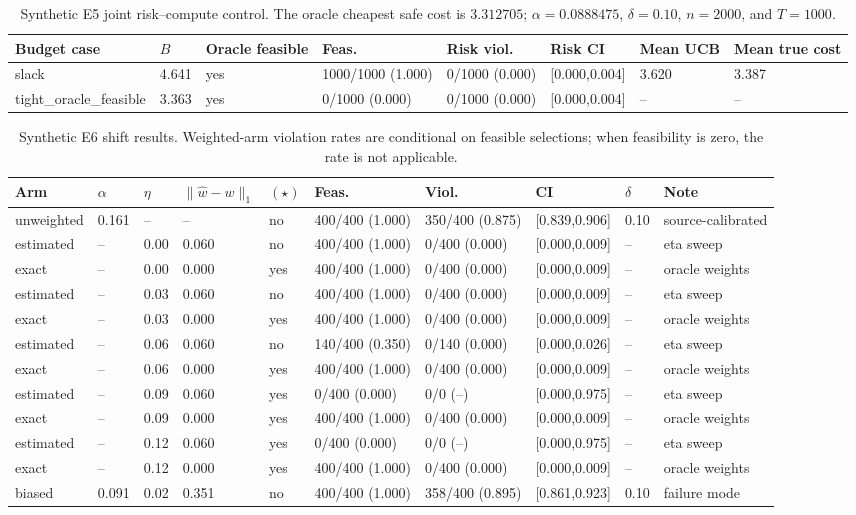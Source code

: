 \documentclass{ieeeaccess}
\begin{document}
\begin{table}[p]
\centering
\caption{Synthetic E5 joint risk--compute control. The oracle cheapest safe cost is $3.312705$; $\alpha=0.0888475$, $\delta=0.10$, $n=2000$, and $T=1000$.}
\label{tab:embedded-e5}
\begin{tabular}{@{}llllllll@{}}
\toprule
Budget case & $B$ & Oracle feasible & Feas. & Risk viol. & Risk CI & Mean UCB & Mean true cost \\
\midrule
slack & 4.641 & yes & 1000/1000 (1.000) & 0/1000 (0.000) & [0.000,0.004] & 3.620 & 3.387 \\
tight\_oracle\_feasible & 3.363 & yes & 0/1000 (0.000) & 0/1000 (0.000) & [0.000,0.004] & -- & -- \\
\bottomrule
\end{tabular}
\end{table}

\begin{table}[p]
\centering
\caption{Synthetic E6 shift results. Weighted-arm violation rates are conditional on feasible selections; when feasibility is zero, the rate is not applicable.}
\label{tab:embedded-e6}
\begin{tabular}{@{}llllllllll@{}}
\toprule
Arm & $\alpha$ & $\eta$ & $\|\hat w-w\|_1$ & $(\star)$ & Feas. & Viol. & CI & $\delta$ & Note \\
\midrule
unweighted & 0.161 & -- & -- & no & 400/400 (1.000) & 350/400 (0.875) & [0.839,0.906] & 0.10 & source-calibrated \\
estimated & -- & 0.00 & 0.060 & no & 400/400 (1.000) & 0/400 (0.000) & [0.000,0.009] & -- & eta sweep \\
exact & -- & 0.00 & 0.000 & yes & 400/400 (1.000) & 0/400 (0.000) & [0.000,0.009] & -- & oracle weights \\
estimated & -- & 0.03 & 0.060 & no & 400/400 (1.000) & 0/400 (0.000) & [0.000,0.009] & -- & eta sweep \\
exact & -- & 0.03 & 0.000 & yes & 400/400 (1.000) & 0/400 (0.000) & [0.000,0.009] & -- & oracle weights \\
estimated & -- & 0.06 & 0.060 & no & 140/400 (0.350) & 0/140 (0.000) & [0.000,0.026] & -- & eta sweep \\
exact & -- & 0.06 & 0.000 & yes & 400/400 (1.000) & 0/400 (0.000) & [0.000,0.009] & -- & oracle weights \\
estimated & -- & 0.09 & 0.060 & yes & 0/400 (0.000) & 0/0 (--) & [0.000,0.975] & -- & eta sweep \\
exact & -- & 0.09 & 0.000 & yes & 400/400 (1.000) & 0/400 (0.000) & [0.000,0.009] & -- & oracle weights \\
estimated & -- & 0.12 & 0.060 & yes & 0/400 (0.000) & 0/0 (--) & [0.000,0.975] & -- & eta sweep \\
exact & -- & 0.12 & 0.000 & yes & 400/400 (1.000) & 0/400 (0.000) & [0.000,0.009] & -- & oracle weights \\
biased & 0.091 & 0.02 & 0.351 & no & 400/400 (1.000) & 358/400 (0.895) & [0.861,0.923] & 0.10 & failure mode \\
\bottomrule
\end{tabular}
\end{table}
\end{document}
